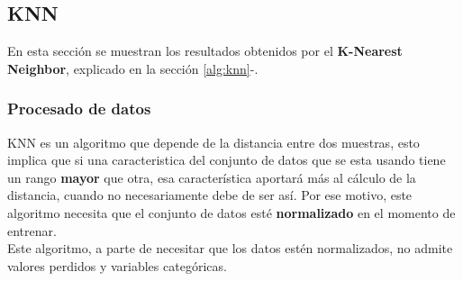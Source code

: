 \subsection{KNN}
En esta sección se muestran los resultados obtenidos por el \textbf{K-Nearest Neighbor}, explicado en la sección \ref{alg:knn}-.
\subsubsection*{Procesado de datos}
KNN es un algoritmo que depende de la distancia entre dos muestras, esto implica que si una caracteristica del conjunto de datos que se esta usando tiene un rango \textbf{mayor} que otra, esa característica aportará más al cálculo de la distancia, cuando no necesariamente debe de ser así. Por ese motivo, este algoritmo necesita que el conjunto de datos esté \textbf{normalizado} en el momento de entrenar.\\
\linebreak
Este algoritmo, a parte de necesitar que los datos estén normalizados, no admite valores perdidos y variables categóricas.

